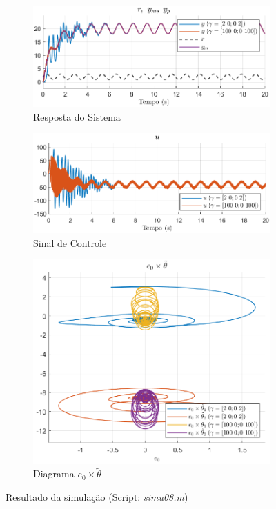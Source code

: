 \documentclass[10pt]{article}
\begin{document}
\begin{figure}[h!]
    \begin{subfigure}[b]{0.3\textwidth}
        \centering
        \includegraphics[width=\textwidth]{img/fig08c.png}
        \caption{Resposta do Sistema}
    \end{subfigure}
    \begin{subfigure}[b]{0.3\textwidth}
        \centering
        \includegraphics[width=\textwidth]{img/fig08e.png}
        \caption{Sinal de Controle}
    \end{subfigure}

    \begin{subfigure}[b]{0.3\textwidth}
        \centering
        \includegraphics[width=\textwidth]{img/fig08d.png}
        \caption{Diagrama $e_0 \times \tilde{\theta}$}
    \end{subfigure}

    \caption{Resultado da simulação (Script: \textit{simu08.m})}
    \label{fig:sim8}
\end{figure}
\end{document}
